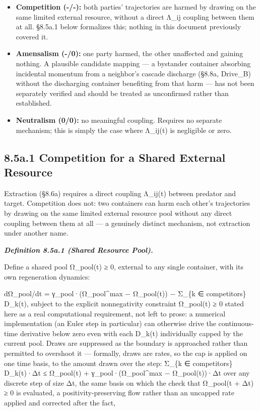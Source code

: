 \documentclass[
]{article}
\begin{document}
\begin{itemize}
\item
  \textbf{Competition (-/-):} both parties' trajectories are harmed by
  drawing on the same limited external resource, without a direct Λ\_ij
  coupling between them at all. §8.5a.1 below formalizes this; nothing
  in this document previously covered it.
\item
  \textbf{Amensalism (-/0):} one party harmed, the other unaffected and
  gaining nothing. A plausible candidate mapping --- a bystander
  container absorbing incidental momentum from a neighbor's cascade
  discharge (§8.8a, Drive\_B) without the discharging container
  benefiting from that harm --- has not been separately verified and
  should be treated as unconfirmed rather than established.
\item
  \textbf{Neutralism (0/0):} no meaningful coupling. Requires no
  separate mechanism; this is simply the case where Λ\_ij(t) is
  negligible or zero.
\end{itemize}

\hypertarget{a.1-competition-for-a-shared-external-resource}{%
\subsection{8.5a.1 Competition for a Shared External
Resource}\label{a.1-competition-for-a-shared-external-resource}}

Extraction (§8.6a) requires a direct coupling Λ\_ij(t) between predator
and target. Competition does not: two containers can harm each other's
trajectories by drawing on the same limited external resource pool
without any direct coupling between them at all --- a genuinely distinct
mechanism, not extraction under another name.

\emph{\textbf{Definition 8.5a.1 (Shared Resource Pool).}}

Define a shared pool Ω\_pool(t) ≥ 0, external to any single container,
with its own regeneration dynamics:

dΩ\_pool/dt = γ\_pool·(Ω\_pool\^{}max − Ω\_pool(t)) − Σ\_\{k ∈
competitors\} D\_k(t), subject to the explicit nonnegativity constraint
Ω\_pool(t) ≥ 0 stated here as a real computational requirement, not left
to prose: a numerical implementation (an Euler step in particular) can
otherwise drive the continuous-time derivative below zero even with each
D\_k(t) individually capped by the current pool. Draws are suppressed as
the boundary is approached rather than permitted to overshoot it ---
formally, draws are rates, so the cap is applied on one time basis, to
the amount drawn over the step: Σ\_\{k ∈ competitors\} D\_k(t)·Δt ≤
Ω\_pool(t) + γ\_pool·(Ω\_pool\^{}max − Ω\_pool(t))·Δt over any discrete
step of size Δt, the same basis on which the check that Ω\_pool(t + Δt)
≥ 0 is evaluated, a positivity-preserving flow rather than an uncapped
rate applied and corrected after the fact,
\end{document}
